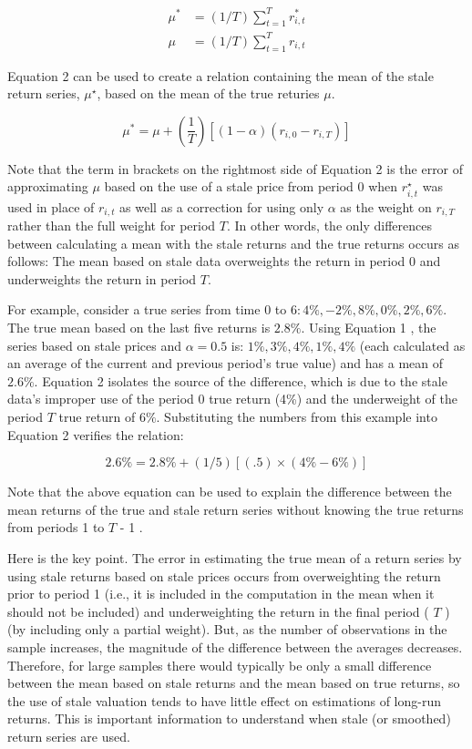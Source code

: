 \documentclass[11pt]{article}
\begin{document}
$$
\begin{aligned}
\mu^{*} & =(1 / T) \sum_{t=1}^{T} r_{i, t}^{*} \\
\mu & =(1 / T) \sum_{t=1}^{T} r_{i, t}
\end{aligned}
$$

Equation 2 can be used to create a relation containing the mean of the stale return series, $\mu^{\star}$, based on the mean of the true returies $\mu$.


\begin{equation*}
\mu^{*}=\mu+\left(\frac{1}{T}\right)\left[(1-\alpha)\left(r_{i, 0}-r_{i, T}\right)\right] \tag{2}
\end{equation*}


Note that the term in brackets on the rightmost side of Equation 2 is the error of approximating $\mu$ based on the use of a stale price from period 0 when $r_{i, t}^{\star}$ was used in place of $r_{i, t}$ as well as a correction for using only $\alpha$ as the weight on $r_{i, T}$ rather than the full weight for period $T$. In other words, the only differences between calculating a mean with the stale returns and the true returns occurs as follows: The mean based on stale data overweights the return in period 0 and underweights the return in period $T$.

For example, consider a true series from time 0 to $6: 4 \%,-2 \%, 8 \%, 0 \%, 2 \%, 6 \%$. The true mean based on the last five returns is $2.8 \%$. Using Equation 1 , the series based on stale prices and $\alpha=0.5$ is: $1 \%, 3 \%, 4 \%, 1 \%, 4 \%$ (each calculated as an average of the current and previous period's true value) and has a mean of $2.6 \%$. Equation 2 isolates the source of the difference, which is due to the stale data's improper use of the period 0 true return (4\%) and the underweight of the period $T$ true return of $6 \%$. Substituting the numbers from this example into Equation 2 verifies the relation:

$$
2.6 \%=2.8 \%+(1 / 5)[(.5) \times(4 \%-6 \%)]
$$

Note that the above equation can be used to explain the difference between the mean returns of the true and stale return series without knowing the true returns from periods 1 to $T$ - 1 .

Here is the key point. The error in estimating the true mean of a return series by using stale returns based on stale prices occurs from overweighting the return prior to period 1 (i.e., it is included in the computation in the mean when it should not be included) and underweighting the return in the final period ( $T$ ) (by including only a partial weight). But, as the number of observations in the sample increases, the magnitude of the difference between the averages decreases. Therefore, for large samples there would typically be only a small difference between the mean based on stale returns and the mean based on true returns, so the use of stale valuation tends to have little effect on estimations of long-run returns. This is important information to understand when stale (or smoothed) return series are used.
\end{document}
